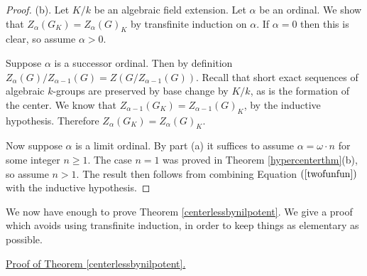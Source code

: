 \documentclass[twoside,a4paper,reqno,11pt]{amsart}
\theoremstyle{definition}
\begin{document}
\begin{proof}
\vspace{2mm}\noindent (b). Let $K/k$ be an algebraic field extension. Let $\alpha$ be an ordinal. We show that $Z_\alpha(G_K)=Z_\alpha(G)_K$ by transfinite induction on $\alpha$. If $\alpha=0$ then this is clear, so assume $\alpha>0$.

\vspace{2mm}\noindent Suppose $\alpha$ is a successor ordinal. Then by definition $Z_{\alpha}(G)/Z_{\alpha-1}(G)=Z(G/Z_{\alpha-1}(G))$. Recall that short exact sequences of algebraic $k$-groups are preserved by base change by $K/k$, as is the formation of the center. We know that $Z_{\alpha-1}(G_K)=Z_{\alpha-1}(G)_K$, by the inductive hypothesis. Therefore $Z_\alpha(G_K)=Z_\alpha(G)_K$.

\vspace{2mm}\noindent Now suppose $\alpha$ is a limit ordinal. By part (a) it suffices to assume $\alpha=\omega\cdot n$ for some integer $n\geq 1$. The case $n=1$ was proved in Theorem \ref{hypercenterthm}(b), so assume $n>1$. The result then follows from combining Equation $(\ref{twofunfun})$ with the inductive hypothesis.
\end{proof}

\noindent We now have enough to prove Theorem \ref{centerlessbynilpotent}. We give a proof which avoids using transfinite induction, in order to keep things as elementary as possible. %

\vspace{2mm}\noindent \underline{Proof of Theorem \ref{centerlessbynilpotent}.}
\end{document}
